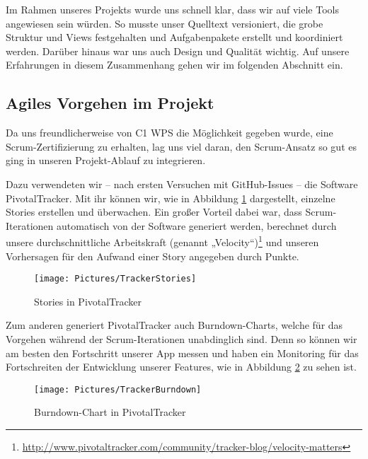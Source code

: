 Im Rahmen unseres Projekts wurde uns schnell klar, dass wir auf viele Tools angewiesen sein würden. So musste unser Quelltext versioniert, die grobe Struktur und Views festgehalten und Aufgabenpakete erstellt und koordiniert werden. Darüber hinaus war uns auch Design und Qualität wichtig. Auf unsere Erfahrungen in diesem Zusammenhang gehen wir im folgenden Abschnitt ein.

\subsection{Agiles Vorgehen im Projekt}
	Da uns freundlicherweise von C1 WPS die Möglichkeit gegeben wurde, eine Scrum-Zer\-ti\-fi\-zie\-rung zu erhalten, lag uns viel daran, den Scrum-Ansatz so gut es ging in unseren Projekt-Ablauf zu integrieren.
	
	Dazu verwendeten wir – nach ersten Versuchen mit GitHub-Issues – die Software PivotalTracker. Mit ihr können wir, wie in Abbildung \ref{fig:TrackerStories} dargestellt, einzelne Stories erstellen und überwachen. Ein großer Vorteil dabei war, dass Scrum-Iterationen automatisch von der Software generiert werden, berechnet durch unsere durchschnittliche Arbeitskraft (genannt „Velocity“)\footnote{\url{http://www.pivotaltracker.com/community/tracker-blog/velocity-matters}} und unseren Vorhersagen für den Aufwand einer Story angegeben durch Punkte.
	
\begin{figure}[h!]
	\centering
	\texttt{[image: Pictures/TrackerStories]}
	\vspace{-.8cm}
	\caption{Stories in PivotalTracker\label{fig:TrackerStories}}
\end{figure}

\noindent	Zum anderen generiert PivotalTracker auch Burndown-Charts, welche für das Vorgehen während der Scrum-Iterationen unabdinglich sind. Denn so können wir am besten den Fortschritt unserer App messen und haben ein Monitoring für das Fortschreiten der Entwicklung unserer Features, wie in Abbildung \ref{fig:TrackerBurndown} zu sehen ist.

\begin{figure}[h]
	\centering
	\texttt{[image: Pictures/TrackerBurndown]}
	\vspace{-.8cm}
	\caption{Burndown-Chart in PivotalTracker\label{fig:TrackerBurndown}}
\end{figure}

